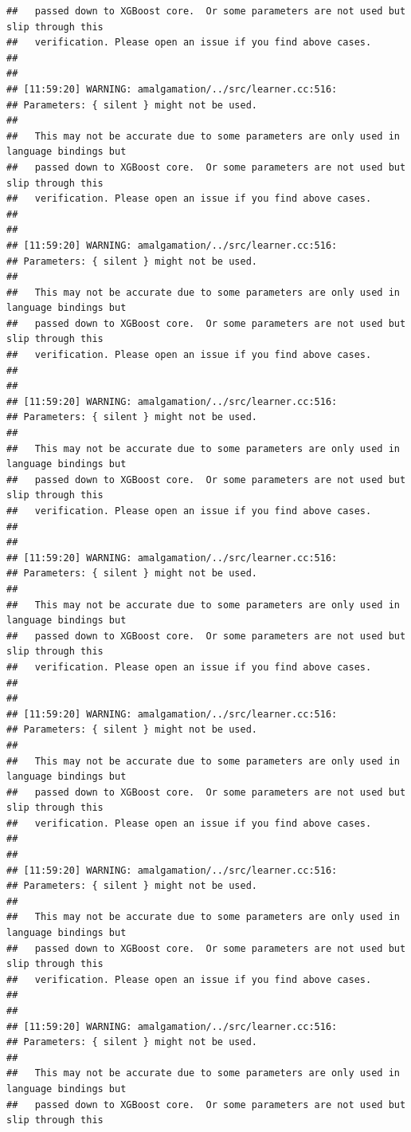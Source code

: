 \documentclass[AMS,STIX2COL]{WileyNJD-v2}\usepackage[]{graphicx}\usepackage[]{color}
\makeatletter
\newenvironment{kframe}{%
 \def\at@end@of@kframe{}%
 \ifinner\ifhmode%
  \def\at@end@of@kframe{\end{minipage}}%
  \begin{minipage}{\columnwidth}%
 \fi\fi%
 \def\FrameCommand##1{\hskip\@totalleftmargin \hskip-\fboxsep
 \colorbox{shadecolor}{##1}\hskip-\fboxsep
     \hskip-\linewidth \hskip-\@totalleftmargin \hskip\columnwidth}%
 \MakeFramed {\advance\hsize-\width
   \@totalleftmargin\z@ \linewidth\hsize
   \@setminipage}}%
 {\par\unskip\endMakeFramed%
 \at@end@of@kframe}
\newenvironment{knitrout}{}{} %
\makeatother
\begin{document}
\begin{knitrout}
\begin{kframe}
\begin{verbatim}
##   passed down to XGBoost core.  Or some parameters are not used but slip through this
##   verification. Please open an issue if you find above cases.
## 
## 
## [11:59:20] WARNING: amalgamation/../src/learner.cc:516: 
## Parameters: { silent } might not be used.
## 
##   This may not be accurate due to some parameters are only used in language bindings but
##   passed down to XGBoost core.  Or some parameters are not used but slip through this
##   verification. Please open an issue if you find above cases.
## 
## 
## [11:59:20] WARNING: amalgamation/../src/learner.cc:516: 
## Parameters: { silent } might not be used.
## 
##   This may not be accurate due to some parameters are only used in language bindings but
##   passed down to XGBoost core.  Or some parameters are not used but slip through this
##   verification. Please open an issue if you find above cases.
## 
## 
## [11:59:20] WARNING: amalgamation/../src/learner.cc:516: 
## Parameters: { silent } might not be used.
## 
##   This may not be accurate due to some parameters are only used in language bindings but
##   passed down to XGBoost core.  Or some parameters are not used but slip through this
##   verification. Please open an issue if you find above cases.
## 
## 
## [11:59:20] WARNING: amalgamation/../src/learner.cc:516: 
## Parameters: { silent } might not be used.
## 
##   This may not be accurate due to some parameters are only used in language bindings but
##   passed down to XGBoost core.  Or some parameters are not used but slip through this
##   verification. Please open an issue if you find above cases.
## 
## 
## [11:59:20] WARNING: amalgamation/../src/learner.cc:516: 
## Parameters: { silent } might not be used.
## 
##   This may not be accurate due to some parameters are only used in language bindings but
##   passed down to XGBoost core.  Or some parameters are not used but slip through this
##   verification. Please open an issue if you find above cases.
## 
## 
## [11:59:20] WARNING: amalgamation/../src/learner.cc:516: 
## Parameters: { silent } might not be used.
## 
##   This may not be accurate due to some parameters are only used in language bindings but
##   passed down to XGBoost core.  Or some parameters are not used but slip through this
##   verification. Please open an issue if you find above cases.
## 
## 
## [11:59:20] WARNING: amalgamation/../src/learner.cc:516: 
## Parameters: { silent } might not be used.
## 
##   This may not be accurate due to some parameters are only used in language bindings but
##   passed down to XGBoost core.  Or some parameters are not used but slip through this

\end{verbatim}
\end{kframe}
\end{knitrout}
\end{document}
